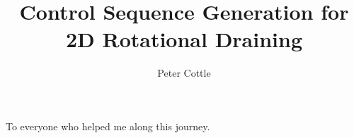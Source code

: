 \documentclass[masters]{ucbthesis}
\begin{document}

\title{Control Sequence Generation for 2D Rotational Draining}
\author{Peter Cottle}


\maketitle
\approvalpage
\copyrightpage



\begin{frontmatter}



\tableofcontents
\clearpage
\listoffigures
\clearpage
\listoftables

\begin{acknowledgements}
\begin{center}
To everyone who helped me along this journey.
\end{center}
\end{acknowledgements}

\end{frontmatter}

\pagestyle{headings}










\printbibliography
\end{document}
